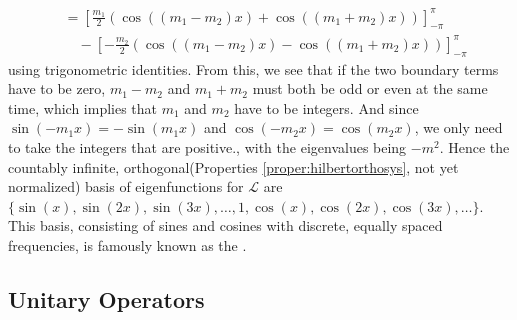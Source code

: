 \begin{solution}
{\begin{align*}
&= [\frac{m_1}{2}(\cos((m_1-m_2)x) + \cos((m_1+m_2)x))]_{-\pi}^\pi \\
&\quad - [-\frac{m_2}{2}(\cos((m_1-m_2)x) - \cos((m_1+m_2)x))]_{-\pi}^\pi 
\end{align*}
using trigonometric identities. From this, we see that if the two boundary terms have to be zero, $m_1 - m_2$ and $m_1 + m_2$ must both be odd or even at the same time, which implies that $m_1$ and $m_2$ have to be integers. And since $\sin(-m_1 x) = -\sin(m_1 x)$ and $\cos(-m_2 x) = \cos(m_2 x)$, we only need to take the integers that are positive.}, with the eigenvalues being $-m^2$. Hence the countably infinite, orthogonal\footnotemark (Properties \ref{proper:hilbertorthosys}, not yet normalized) basis of eigenfunctions for $\mathcal{L}$ are $\{\sin(x), \sin(2x), \sin(3x), \ldots, 1, \cos(x), \cos(2x), \cos(3x), \ldots\}$. This basis, consisting of sines and cosines with discrete, equally spaced frequencies, is famously known as the .
\end{solution}

\subsection{Unitary Operators}

